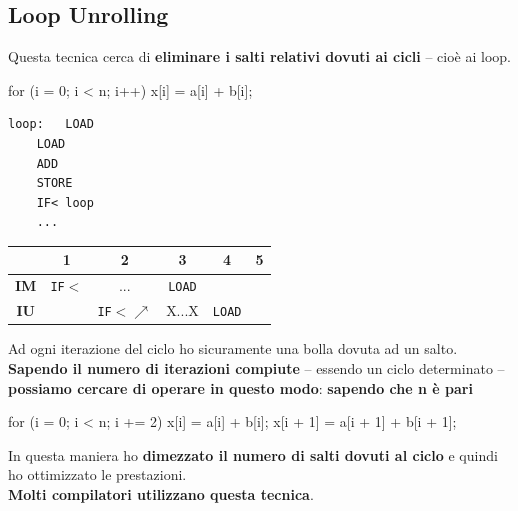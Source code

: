 \documentclass[10pt]{report}
\begin{document}
\subsection{Loop Unrolling}
Questa tecnica cerca di \textbf{eliminare i salti relativi dovuti ai cicli} -- cioè ai loop.
\begin{multicols}{2}
\begin{C}
for (i = 0; i < n; i++)
	x[i] = a[i] + b[i];
\end{C}
\columnbreak
\begin{lstlisting}
loop:	LOAD
	LOAD
	ADD
	STORE
	IF<	loop
	...
\end{lstlisting}
\end{multicols}
\begin{center}
\begin{tabular}{c|c|c|c|c|c|}
	 & 1 & 2 & 3 & 4 & 5 \\
	\hline
	\textbf{IM} & \texttt{IF$<$} & ... & \texttt{LOAD} & & \\
	\hline
	\textbf{IU} & & \texttt{IF$<$}$\nearrow$ & X...X & \texttt{LOAD} & \\
	\hline
\end{tabular}
\end{center}
\pagebreak
Ad ogni iterazione del ciclo ho sicuramente una bolla dovuta ad un salto. \textbf{Sapendo il numero di iterazioni compiute} -- essendo un ciclo determinato -- \textbf{possiamo cercare di operare in questo modo}: \textbf{sapendo che n è pari}
\begin{C}
for (i = 0; i < n; i += 2) {
	x[i] = a[i] + b[i];
	x[i + 1] = a[i + 1] + b[i + 1];
}
\end{C}
In questa maniera ho \textbf{dimezzato il numero di salti dovuti al ciclo} e quindi ho ottimizzato le prestazioni.\\
\textbf{Molti compilatori utilizzano questa tecnica}.
\end{document}
